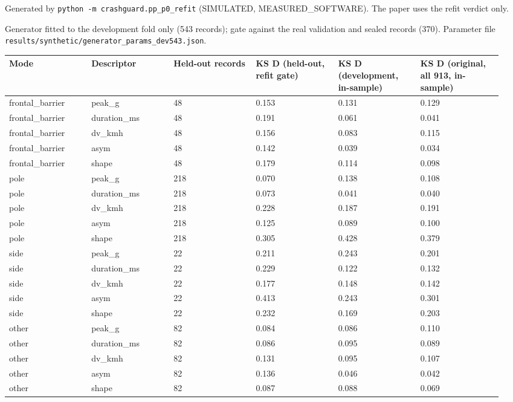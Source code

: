 Generated by \texttt{python -m crashguard.pp\_p0\_refit} (SIMULATED, MEASURED\_SOFTWARE). The paper uses the refit verdict only.

Generator fitted to the development fold only (543 records); gate against the real validation and sealed records (370). Parameter file \texttt{results/synthetic/generator\_params\_dev543.json}.

{\scriptsize\raggedright
\begin{longtable}{p{0.158\linewidth}p{0.158\linewidth}p{0.158\linewidth}p{0.158\linewidth}p{0.158\linewidth}p{0.158\linewidth}}
\toprule
Mode & Descriptor & Held-out records & KS D (held-out, refit gate) & KS D (development, in-sample) & KS D (original, all 913, in-sample) \\
\midrule
\endhead
frontal\_barrier & peak\_g & 48 & 0.153 & 0.131 & 0.129 \\
frontal\_barrier & duration\_ms & 48 & 0.191 & 0.061 & 0.041 \\
frontal\_barrier & dv\_kmh & 48 & 0.156 & 0.083 & 0.115 \\
frontal\_barrier & asym & 48 & 0.142 & 0.039 & 0.034 \\
frontal\_barrier & shape & 48 & 0.179 & 0.114 & 0.098 \\
pole & peak\_g & 218 & 0.070 & 0.138 & 0.108 \\
pole & duration\_ms & 218 & 0.073 & 0.041 & 0.040 \\
pole & dv\_kmh & 218 & 0.228 & 0.187 & 0.191 \\
pole & asym & 218 & 0.125 & 0.089 & 0.100 \\
pole & shape & 218 & 0.305 & 0.428 & 0.379 \\
side & peak\_g & 22 & 0.211 & 0.243 & 0.201 \\
side & duration\_ms & 22 & 0.229 & 0.122 & 0.132 \\
side & dv\_kmh & 22 & 0.177 & 0.148 & 0.142 \\
side & asym & 22 & 0.413 & 0.243 & 0.301 \\
side & shape & 22 & 0.232 & 0.169 & 0.203 \\
other & peak\_g & 82 & 0.084 & 0.086 & 0.110 \\
other & duration\_ms & 82 & 0.086 & 0.095 & 0.089 \\
other & dv\_kmh & 82 & 0.131 & 0.095 & 0.107 \\
other & asym & 82 & 0.136 & 0.046 & 0.042 \\
other & shape & 82 & 0.087 & 0.088 & 0.069 \\
\bottomrule
\end{longtable}}

